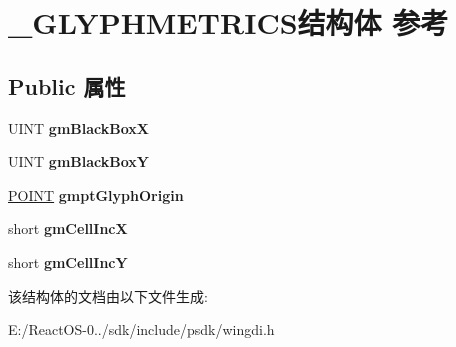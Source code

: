 \hypertarget{struct___g_l_y_p_h_m_e_t_r_i_c_s}{}\section{\+\_\+\+G\+L\+Y\+P\+H\+M\+E\+T\+R\+I\+C\+S结构体 参考}
\label{struct___g_l_y_p_h_m_e_t_r_i_c_s}
\subsection*{Public 属性}
\begin{DoxyCompactItemize}
\item 
\mbox{\label{struct___g_l_y_p_h_m_e_t_r_i_c_s_a6942c226841b5dd1141d925ad6e0297e}} 
U\+I\+NT {\bfseries gm\+Black\+BoxX}
\item 
\mbox{\label{struct___g_l_y_p_h_m_e_t_r_i_c_s_a64ccabbd6ee03373a42e3230fc750750}} 
U\+I\+NT {\bfseries gm\+Black\+BoxY}
\item 
\mbox{\label{struct___g_l_y_p_h_m_e_t_r_i_c_s_a8142b78adf4f2370f61237dc46b110f3}} 
\hyperlink{structtag_p_o_i_n_t}{P\+O\+I\+NT} {\bfseries gmpt\+Glyph\+Origin}
\item 
\mbox{\label{struct___g_l_y_p_h_m_e_t_r_i_c_s_a30f2d88f5737f64714b924f08caf90d4}} 
short {\bfseries gm\+Cell\+IncX}
\item 
\mbox{\label{struct___g_l_y_p_h_m_e_t_r_i_c_s_a7e0359c2a8e12ebbe27735a0ea68f060}} 
short {\bfseries gm\+Cell\+IncY}
\end{DoxyCompactItemize}


该结构体的文档由以下文件生成\+:\begin{DoxyCompactItemize}
\item 
E\+:/\+React\+O\+S-\/0../sdk/include/psdk/wingdi.\+h\end{DoxyCompactItemize}

